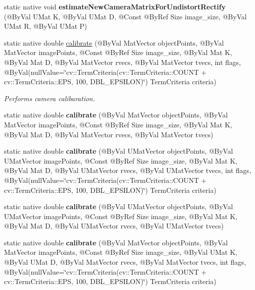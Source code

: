 \begin{DoxyCompactItemize}
\item 
static native void {\bfseries estimate\+New\+Camera\+Matrix\+For\+Undistort\+Rectify} (@By\+Val U\+Mat K, @By\+Val U\+Mat D, @Const @By\+Ref Size image\+\_\+size, @By\+Val U\+Mat R, @By\+Val U\+Mat P)
\item 
static native double \hyperlink{group__calib3d__fisheye_ga4fd78a3672b06b47ba34e82e17824e9d}{calibrate} (@By\+Val Mat\+Vector object\+Points, @By\+Val Mat\+Vector image\+Points, @Const @By\+Ref Size image\+\_\+size, @By\+Val Mat K, @By\+Val Mat D, @By\+Val Mat\+Vector rvecs, @By\+Val Mat\+Vector tvecs, int flags, @By\+Val(null\+Value=\char`\"{}cv\+::\+Term\+Criteria(cv\+::\+Term\+Criteria\+::\+C\+O\+U\+NT + cv\+::\+Term\+Criteria\+::\+E\+PS, 100, D\+B\+L\+\_\+\+E\+P\+S\+I\+L\+ON)\char`\"{}) Term\+Criteria criteria)
\begin{DoxyCompactList}\small\item\em Performs camera calibaration. \end{DoxyCompactList}\item 
static native double {\bfseries calibrate} (@By\+Val Mat\+Vector object\+Points, @By\+Val Mat\+Vector image\+Points, @Const @By\+Ref Size image\+\_\+size, @By\+Val Mat K, @By\+Val Mat D, @By\+Val Mat\+Vector rvecs, @By\+Val Mat\+Vector tvecs)
\item 
static native double {\bfseries calibrate} (@By\+Val U\+Mat\+Vector object\+Points, @By\+Val U\+Mat\+Vector image\+Points, @Const @By\+Ref Size image\+\_\+size, @By\+Val Mat K, @By\+Val Mat D, @By\+Val U\+Mat\+Vector rvecs, @By\+Val U\+Mat\+Vector tvecs, int flags, @By\+Val(null\+Value=\char`\"{}cv\+::\+Term\+Criteria(cv\+::\+Term\+Criteria\+::\+C\+O\+U\+NT + cv\+::\+Term\+Criteria\+::\+E\+PS, 100, D\+B\+L\+\_\+\+E\+P\+S\+I\+L\+ON)\char`\"{}) Term\+Criteria criteria)
\item 
static native double {\bfseries calibrate} (@By\+Val U\+Mat\+Vector object\+Points, @By\+Val U\+Mat\+Vector image\+Points, @Const @By\+Ref Size image\+\_\+size, @By\+Val Mat K, @By\+Val Mat D, @By\+Val U\+Mat\+Vector rvecs, @By\+Val U\+Mat\+Vector tvecs)
\item 
static native double {\bfseries calibrate} (@By\+Val Mat\+Vector object\+Points, @By\+Val Mat\+Vector image\+Points, @Const @By\+Ref Size image\+\_\+size, @By\+Val U\+Mat K, @By\+Val U\+Mat D, @By\+Val Mat\+Vector rvecs, @By\+Val Mat\+Vector tvecs, int flags, @By\+Val(null\+Value=\char`\"{}cv\+::\+Term\+Criteria(cv\+::\+Term\+Criteria\+::\+C\+O\+U\+NT + cv\+::\+Term\+Criteria\+::\+E\+PS, 100, D\+B\+L\+\_\+\+E\+P\+S\+I\+L\+ON)\char`\"{}) Term\+Criteria criteria)

\end{DoxyCompactItemize}
